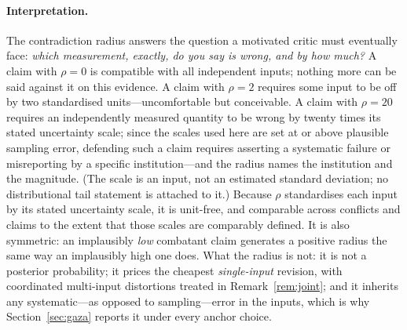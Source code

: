 \paragraph{Interpretation.} The contradiction radius answers the question a motivated critic must eventually face: \emph{which measurement, exactly, do you say is wrong, and by how much?} A claim with $\rho=0$ is compatible with all independent inputs; nothing more can be said against it on this evidence. A claim with $\rho=2$ requires some input to be off by two standardised units---uncomfortable but conceivable. A claim with $\rho=20$ requires an independently measured quantity to be wrong by twenty times its stated uncertainty scale; since the scales used here are set at or above plausible sampling error, defending such a claim requires asserting a systematic failure or misreporting by a specific institution---and the radius names the institution and the magnitude. (The scale is an input, not an estimated standard deviation; no distributional tail statement is attached to it.) Because $\rho$ standardises each input by its stated uncertainty scale, it is unit-free, and comparable across conflicts and claims to the extent that those scales are comparably defined. It is also symmetric: an implausibly \emph{low} combatant claim generates a positive radius the same way an implausibly high one does. What the radius is not: it is not a posterior probability; it prices the cheapest \emph{single-input} revision, with coordinated multi-input distortions treated in Remark~\ref{rem:joint}; and it inherits any systematic---as opposed to sampling---error in the inputs, which is why Section~\ref{sec:gaza} reports it under every anchor choice.


